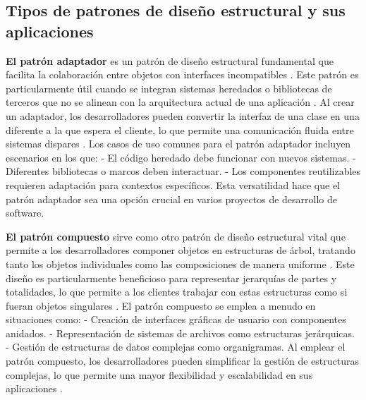 \documentclass[12pt]{article}
\begin{document}
\subsection*{Tipos de patrones de diseño estructural y sus aplicaciones}
\textbf{El patrón adaptador} es un patrón de diseño estructural fundamental que facilita la colaboración entre objetos con interfaces incompatibles \cite{ref3}. Este patrón es particularmente útil cuando se integran sistemas heredados o bibliotecas de terceros que no se alinean con la arquitectura actual de una aplicación \cite{ref4}. Al crear un adaptador, los desarrolladores pueden convertir la interfaz de una clase en una diferente a la que espera el cliente, lo que permite una comunicación fluida entre sistemas dispares \cite{ref5}. Los casos de uso comunes para el patrón adaptador incluyen escenarios en los que:\newline
- El código heredado debe funcionar con nuevos sistemas.\newline
- Diferentes bibliotecas o marcos deben interactuar.\newline
- Los componentes reutilizables requieren adaptación para contextos específicos.\newline
Esta versatilidad hace que el patrón adaptador sea una opción crucial en varios proyectos de desarrollo de software.

\textbf{El patrón compuesto} sirve como otro patrón de diseño estructural vital que permite a los desarrolladores componer objetos en estructuras de árbol, tratando tanto los objetos individuales como las composiciones de manera uniforme \cite{ref6}. Este diseño es particularmente beneficioso para representar jerarquías de partes y totalidades, lo que permite a los clientes trabajar con estas estructuras como si fueran objetos singulares \cite{ref7}. El patrón compuesto se emplea a menudo en situaciones como:\newline
- Creación de interfaces gráficas de usuario con componentes anidados.\newline
- Representación de sistemas de archivos como estructuras jerárquicas.\newline
- Gestión de estructuras de datos complejas como organigramas.\newline
Al emplear el patrón compuesto, los desarrolladores pueden simplificar la gestión de estructuras complejas, lo que permite una mayor flexibilidad y escalabilidad en sus aplicaciones \cite{ref8}.
\end{document}
